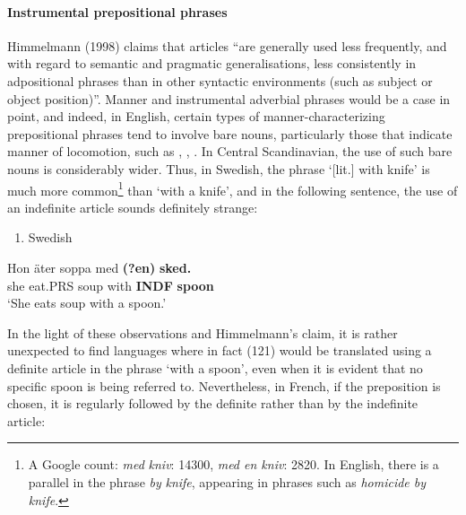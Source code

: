 \paragraph[Instrumental prepositional phrases ]{\rmfamily Instrumental prepositional phrases }
Himmelmann (1998) claims that articles “are generally used less frequently, and with regard to semantic and pragmatic generalisations, less consistently in adpositional phrases than in other syntactic environments (such as subject or object position)”. Manner and instrumental adverbial phrases would be a case in point, and indeed, in English, certain types of manner-characterizing prepositional phrases tend to involve bare nouns, particularly those that indicate manner of locomotion, such as , , . In Central Scandinavian, the use of such bare nouns is considerably wider. Thus, in Swedish, the phrase  ‘[lit.] with knife’ is much more common\footnote{ A Google count: \textit{med}\textit{ }\textit{kniv}: 14300, \textit{med en kniv}: 2820. In English, there is a parallel in the phrase \textit{by} \textit{knife}, appearing in phrases such as \textit{homicide by knife}.} than ‘with a knife’, and in the following sentence, the use of an indefinite article sounds definitely strange:

\begin{enumerate} %
\item 
\label{bkm:Ref224115033}Swedish

\end{enumerate} %
\ea\label{}
\gll Hon  äter  soppa  med  \textbf{(?en)}\textbf{  sked.}\\


she  eat.PRS  soup  with  \textbf{INDF} \textbf{spoon}\\ %


‘She eats soup with a spoon.’
\z


In the light of these observations and Himmelmann’s claim, it is rather unexpected to find languages where in fact (121) would be translated using a definite article in the phrase ‘with a spoon’, even when it is evident that no specific spoon is being referred to. Nevertheless, in French, if the preposition  is chosen, it is regularly followed by the definite rather than by the indefinite article:

